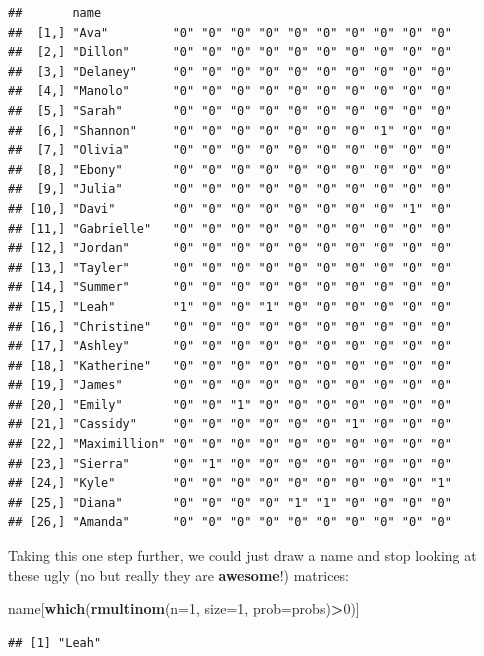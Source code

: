 \documentclass[
]{book}
\newenvironment{Shaded}{\begin{snugshade}}{\end{snugshade}}
\newcommand{\DataTypeTok}[1]{\textcolor[rgb]{0.13,0.29,0.53}{#1}}
\newcommand{\DecValTok}[1]{\textcolor[rgb]{0.00,0.00,0.81}{#1}}
\newcommand{\KeywordTok}[1]{\textcolor[rgb]{0.13,0.29,0.53}{\textbf{#1}}}
\newcommand{\NormalTok}[1]{#1}
\newcommand{\OperatorTok}[1]{\textcolor[rgb]{0.81,0.36,0.00}{\textbf{#1}}}
\begin{document}
\begin{verbatim}
##       name                                                 
##  [1,] "Ava"         "0" "0" "0" "0" "0" "0" "0" "0" "0" "0"
##  [2,] "Dillon"      "0" "0" "0" "0" "0" "0" "0" "0" "0" "0"
##  [3,] "Delaney"     "0" "0" "0" "0" "0" "0" "0" "0" "0" "0"
##  [4,] "Manolo"      "0" "0" "0" "0" "0" "0" "0" "0" "0" "0"
##  [5,] "Sarah"       "0" "0" "0" "0" "0" "0" "0" "0" "0" "0"
##  [6,] "Shannon"     "0" "0" "0" "0" "0" "0" "0" "1" "0" "0"
##  [7,] "Olivia"      "0" "0" "0" "0" "0" "0" "0" "0" "0" "0"
##  [8,] "Ebony"       "0" "0" "0" "0" "0" "0" "0" "0" "0" "0"
##  [9,] "Julia"       "0" "0" "0" "0" "0" "0" "0" "0" "0" "0"
## [10,] "Davi"        "0" "0" "0" "0" "0" "0" "0" "0" "1" "0"
## [11,] "Gabrielle"   "0" "0" "0" "0" "0" "0" "0" "0" "0" "0"
## [12,] "Jordan"      "0" "0" "0" "0" "0" "0" "0" "0" "0" "0"
## [13,] "Tayler"      "0" "0" "0" "0" "0" "0" "0" "0" "0" "0"
## [14,] "Summer"      "0" "0" "0" "0" "0" "0" "0" "0" "0" "0"
## [15,] "Leah"        "1" "0" "0" "1" "0" "0" "0" "0" "0" "0"
## [16,] "Christine"   "0" "0" "0" "0" "0" "0" "0" "0" "0" "0"
## [17,] "Ashley"      "0" "0" "0" "0" "0" "0" "0" "0" "0" "0"
## [18,] "Katherine"   "0" "0" "0" "0" "0" "0" "0" "0" "0" "0"
## [19,] "James"       "0" "0" "0" "0" "0" "0" "0" "0" "0" "0"
## [20,] "Emily"       "0" "0" "1" "0" "0" "0" "0" "0" "0" "0"
## [21,] "Cassidy"     "0" "0" "0" "0" "0" "0" "1" "0" "0" "0"
## [22,] "Maximillion" "0" "0" "0" "0" "0" "0" "0" "0" "0" "0"
## [23,] "Sierra"      "0" "1" "0" "0" "0" "0" "0" "0" "0" "0"
## [24,] "Kyle"        "0" "0" "0" "0" "0" "0" "0" "0" "0" "1"
## [25,] "Diana"       "0" "0" "0" "0" "1" "1" "0" "0" "0" "0"
## [26,] "Amanda"      "0" "0" "0" "0" "0" "0" "0" "0" "0" "0"
\end{verbatim}

Taking this one step further, we could just draw a name and stop looking at these ugly (no but really they are \textbf{awesome}!) matrices:

\begin{Shaded}
\begin{Highlighting}[]
\NormalTok{name[}\KeywordTok{which}\NormalTok{(}\KeywordTok{rmultinom}\NormalTok{(}\DataTypeTok{n=}\DecValTok{1}\NormalTok{, }\DataTypeTok{size=}\DecValTok{1}\NormalTok{, }\DataTypeTok{prob=}\NormalTok{probs)}\OperatorTok{>}\DecValTok{0}\NormalTok{)]}
\end{Highlighting}
\end{Shaded}

\begin{verbatim}
## [1] "Leah"
\end{verbatim}
\end{document}
